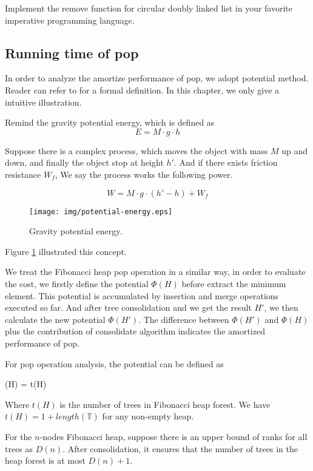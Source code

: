 \documentclass{article}
\begin{document}
\begin{Exercise}
Implement the remove function for circular doubly linked list in your favorite
imperative programming language.
\end{Exercise}

\subsection{Running time of pop}

In order to analyze the amortize performance of pop,
we adopt potential method. Reader can refer to \cite{CLRS} for a formal
definition. In this chapter, we only give a intuitive illustration.

Remind the gravity potential energy, which is defined as
\[
E = M \cdot g \cdot h
\]

Suppose there is a complex process, which moves the object with mass $M$
up and down, and finally the object stop at height $h'$. And if there
exists friction resistance $W_f$, We say
the process works the following power.

\[
W = M \cdot g \cdot (h' - h) + W_f
\]

\begin{figure}[htbp]
  \centering
  \texttt{[image: img/potential-energy.eps]}
  \caption{Gravity potential energy.}
  \label{fig:potential-energy}
\end{figure}

Figure \ref{fig:potential-energy} illustrated this concept.

We treat the Fibonacci heap pop operation in a similar
way, in order to evaluate the cost, we firstly define the potential
$\Phi(H)$ before extract the minimum element. This potential is
accumulated by insertion and merge operations executed so far.
And after tree consolidation and
we get the result $H'$, we then calculate the new potential $\Phi(H')$.
The difference between $\Phi(H')$ and $\Phi(H)$ plus the contribution
of consolidate algorithm indicates the amortized
performance of pop.

For pop operation analysis, the potential can be defined as

\be
\Phi(H) = t(H)
\ee

Where $t(H)$ is the number of trees in Fibonacci heap forest.
We have $t(H) = 1 + length(\mathbb{T})$ for any non-empty heap.

For the $n$-nodes Fibonacci heap, suppose there is an upper bound
of ranks for all trees as $D(n)$. After consolidation, it ensures
that the number of trees in the heap forest is at most $D(n)+1$.
\end{document}
